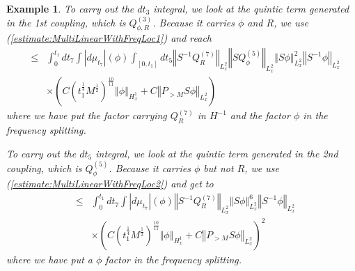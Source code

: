 \documentclass[12pt,letterpaper,leqno]{amsart}
\theoremstyle{plain}
\newtheorem{example}{Example}
\numberwithin{equation}{section}
\numberwithin{theorem}{section}
\numberwithin{proposition}{section}
\numberwithin{lemma}{section}
\numberwithin{corollary}{section}
\begin{document}
\begin{example}
To carry out the $dt_{3}$ integral, we look at the quintic term generated in
the 1st coupling, which is $Q_{\phi ,R}^{(3)}$. Because it carries $\phi $
and $R$, we use (\ref{estimate:MultiLinearWithFreqLoc1}) and reach%
\begin{eqnarray*}
&\leqslant &\int_{0}^{t_{1}}dt_{7}\int \left\vert d\mu _{t_{7}}\right\vert
(\phi )\int_{[0,t_{1}]}dt_{5}\left\Vert S^{-1}Q_{R}^{(7)}\right\Vert
_{L_{x}^{2}}\left\Vert SQ_{\phi }^{(5)}\right\Vert _{L_{x}^{2}}\left\Vert
S\phi \right\Vert _{L_{x}^{2}}^{2}\left\Vert S^{-1}\phi \right\Vert
_{L_{x}^{2}} \\
&&\times \left( C\left( t_{1}^{\frac{1}{4}}M^{\frac{1}{2}}\right) ^{\frac{10%
}{11}}\left\Vert \phi \right\Vert _{H_{x}^{1}}+C\left\Vert P_{>M}S\phi
\right\Vert _{L_{x}^{2}}\right)
\end{eqnarray*}%
where we have put the factor carrying $Q_{R}^{(7)}$ in $H^{-1}$ and the
factor $\phi $ in the frequency splitting.

To carry out the $dt_{5}$ integral, we look at the quintic term generated in
the 2nd coupling, which is $Q_{\phi }^{(5)}$. Because it carries $\phi $ but
not $R$, we use (\ref{estimate:MultiLinearWithFreqLoc2}) and get to%
\begin{eqnarray*}
&\leqslant &\int_{0}^{t_{1}}dt_{7}\int \left\vert d\mu _{t_{7}}\right\vert
(\phi )\left\Vert S^{-1}Q_{R}^{(7)}\right\Vert _{L_{x}^{2}}\left\Vert S\phi
\right\Vert _{L_{x}^{2}}^{6}\left\Vert S^{-1}\phi \right\Vert _{L_{x}^{2}} \\
&&\times \left( C\left( t_{1}^{\frac{1}{4}}M^{\frac{1}{2}}\right) ^{\frac{10%
}{11}}\left\Vert \phi \right\Vert _{H_{x}^{1}}+C\left\Vert P_{>M}S\phi
\right\Vert _{L_{x}^{2}}\right) ^{2}
\end{eqnarray*}%
where we have put a $\phi $ factor in the frequency splitting.


\end{example}
\end{document}
